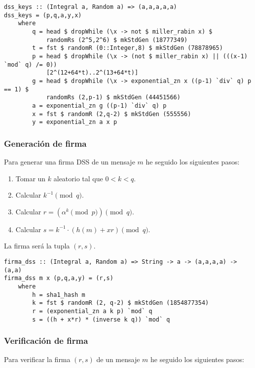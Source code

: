 \documentclass[10pt,spanish]{article}
\begin{document}
\begin{verbatim}
dss_keys :: (Integral a, Random a) => (a,a,a,a,a)
dss_keys = (p,q,a,y,x)
    where
        q = head $ dropWhile (\x -> not $ miller_rabin x) $ 
            randomRs (2^5,2^6) $ mkStdGen (18777349)
        t = fst $ randomR (0::Integer,8) $ mkStdGen (78878965)
        p = head $ dropWhile (\x -> (not $ miller_rabin x) || (((x-1) `mod` q) /= 0)) 
            [2^(12+64*t)..2^(13+64*t)]
        g = head $ dropWhile (\x -> exponential_zn x ((p-1) `div` q) p == 1) $ 
            randomRs (2,p-1) $ mkStdGen (44451566)
        a = exponential_zn g ((p-1) `div` q) p
        x = fst $ randomR (2,q-2) $ mkStdGen (555556)
        y = exponential_zn a x p
\end{verbatim}

\subsubsection{\textcolor{azul}Generación de firma}
Para generar una firma DSS de un mensaje $m$ he seguido los siguientes pasos:

\begin{enumerate}
    \item Tomar un $k$ aleatorio tal que $0 < k < q$.
    \item Calcular $k^{-1} \pmod q$.
    \item Calcular $r = (\alpha^k \pmod p) \pmod q$.
    \item Calcular $s = k^{-1} \cdot (h(m) + xr) \pmod q$.
\end{enumerate}

La firma será la tupla $(r,s)$.

\begin{verbatim}
firma_dss :: (Integral a, Random a) => String -> a -> (a,a,a,a) -> (a,a)
firma_dss m x (p,q,a,y) = (r,s)
    where
        h = sha1_hash m
        k = fst $ randomR (2, q-2) $ mkStdGen (1854877354)
        r = (exponential_zn a k p) `mod` q
        s = ((h + x*r) * (inverse k q)) `mod` q
\end{verbatim}

\subsubsection{\textcolor{azul}Verificación de firma}
Para verificar la firma $(r,s)$ de un mensaje $m$ he seguido los siguientes pasos:
\end{document}
